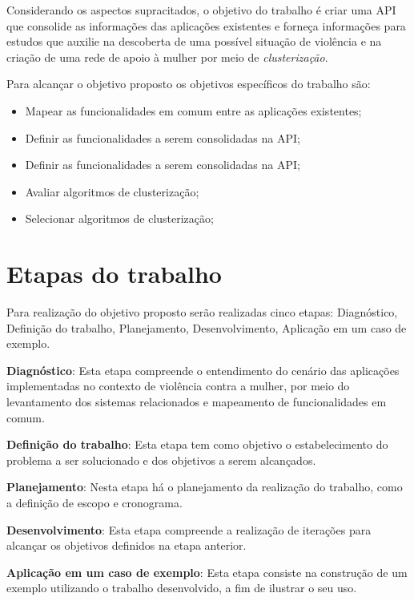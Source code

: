 Considerando os aspectos supracitados, o objetivo do trabalho é criar uma API que consolide as informações das aplicações existentes e forneça informações para estudos que auxilie na descoberta de uma possível situação de violência e na criação de uma rede de apoio à mulher por meio de \textit{clusterização}.

Para alcançar o objetivo proposto os objetivos específicos do trabalho são:
\begin{itemize}
	\item Mapear as funcionalidades em comum entre as aplicações existentes;
	\item Definir as funcionalidades a serem consolidadas na API;
	\item Definir as funcionalidades a serem consolidadas na API;
	\item Avaliar algoritmos de clusterização;
	\item Selecionar algoritmos de clusterização;
\end{itemize}

\section{Etapas do trabalho}

Para realização do objetivo proposto serão realizadas cinco etapas: 
Diagnóstico, Definição do trabalho, Planejamento, Desenvolvimento, Aplicação em um caso de exemplo.

\noindent \textbf{Diagnóstico}: Esta etapa compreende o entendimento do cenário das aplicações implementadas no contexto
de violência contra a mulher, por meio do levantamento dos sistemas relacionados e mapeamento
de funcionalidades em comum.

\noindent \textbf{Definição do trabalho}: Esta etapa tem como objetivo o estabelecimento do problema a ser solucionado e dos objetivos a serem alcançados.

\noindent \textbf{Planejamento}: Nesta etapa há o planejamento da realização do trabalho, como a definição de escopo e cronograma.

\noindent \textbf{Desenvolvimento}: Esta etapa compreende a realização de iterações para 
alcançar os objetivos definidos na etapa anterior.

\noindent \textbf{Aplicação em um caso de exemplo}: Esta etapa consiste na construção de um exemplo utilizando o
trabalho desenvolvido, a fim de ilustrar o seu uso.







